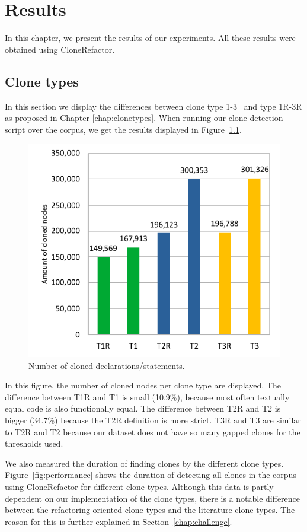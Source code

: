\chapter{Results}\label{ch:results}
In this chapter, we present the results of our experiments. All these results were obtained using CloneRefactor.

\section{Clone types}\label{sec:clonetypeexperiments}
In this section we display the differences between clone type 1-3~\cite{roy2007survey} and type 1R-3R as proposed in Chapter \ref{chap:clonetypes}. When running our clone detection script over the corpus, we get the results displayed in Figure~\ref{fig:typeres}.

\begin{figure}[H]
  \centering
    \includegraphics[width=.5\columnwidth]{img/TypeResults}
      \caption{Number of cloned declarations/statements.}
  \label{fig:typeres}
\end{figure}

In this figure, the number of cloned nodes per clone type are displayed. The difference between T1R and T1 is small (10.9\%), because most often textually equal code is also functionally equal. The difference between T2R and T2 is bigger (34.7\%) because the T2R definition is more strict. T3R and T3 are similar to T2R and T2 because our dataset does not have so many gapped clones for the thresholds used.

We also measured the duration of finding clones by the different clone types. Figure~\ref{fig:performance} shows the duration of detecting all clones in the corpus using CloneRefactor for different clone types. Although this data is partly dependent on our implementation of the clone types, there is a notable difference between the refactoring-oriented clone types and the literature clone types. The reason for this is further explained in Section~\ref{chap:challenge}.


